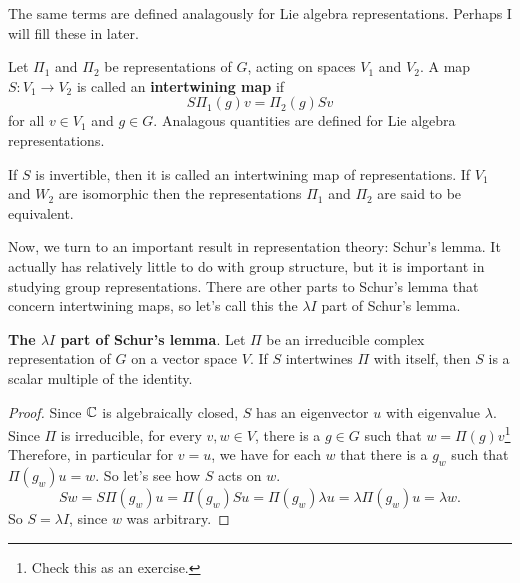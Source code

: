 \documentclass[main.tex]{subfiles}
\begin{document}
The same terms are defined analagously for Lie algebra representations. Perhaps I will fill these in later.

Let $\Pi_1$ and $\Pi_2$ be representations of $G$, acting on spaces $V_1$ and $V_2$. A map $S:V_1 \to V_2$ is called an \textbf{intertwining map} if 
\[
S \Pi_1(g) v = \Pi_2(g) S v
\]
for all $v \in V_1$ and $g \in G$. Analagous quantities are defined for Lie algebra representations.

If $S$ is invertible, then it is called an intertwining map of representations. If $V_1$ and $W_2$ are isomorphic then the representations $\Pi_1$ and $\Pi_2$ are said to be equivalent.

Now, we turn to an important result in representation theory: Schur's lemma. It actually has relatively little to do with group structure, but it is important in studying group representations. There are other parts to Schur's lemma that concern intertwining maps, so let's call this the $\lambda I$ part of Schur's lemma.

\begin{lemma} \label{schurli} \textbf{The $\lambda I$ part of Schur's lemma}. 
Let $\Pi$ be an irreducible complex representation of $G$ on a vector space $V$. If $S$ intertwines $\Pi$ with itself, then $S$ is a scalar multiple of the identity.

\begin{proof}
Since $\mathbb{C}$ is algebraically closed, $S$ has an eigenvector $u$ with eigenvalue $\lambda$. Since $\Pi$ is irreducible, for every $v,w \in V$, there is a $g \in G$ such that $w = \Pi(g) v$\footnote{Check this as an exercise.} Therefore, in particular for $v = u$, we have for each $w$ that there is a $g_w$ such that $\Pi(g_w)u = w$. So let's see how $S$ acts on $w$. 
\[
Sw = S \Pi(g_w) u = \Pi(g_w) S u = \Pi(g_w) \lambda u = \lambda \Pi(g_w) u = \lambda w.
\]
So $S = \lambda I$, since $w$ was arbitrary.
\end{proof}
\end{lemma}
\end{document}
